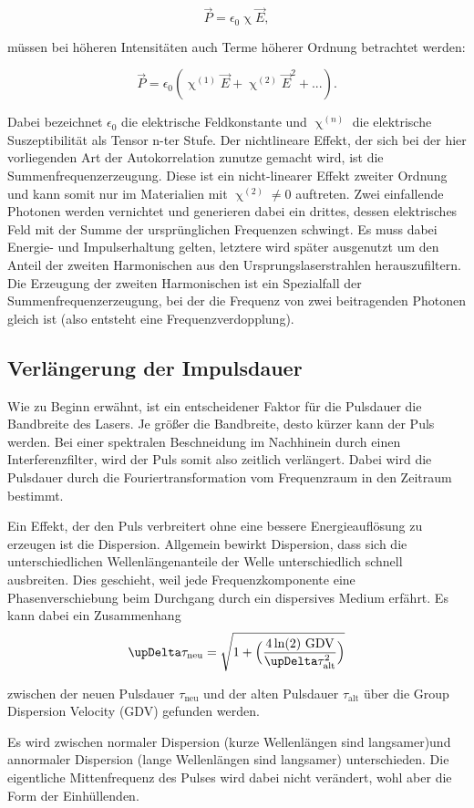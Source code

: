 \begin{equation}
    \vec P = \epsilon_0 \upchi \vec E,
\end{equation}

müssen bei höheren Intensitäten auch Terme höherer Ordnung betrachtet werden:

\begin{equation}
    \vec P = \epsilon_0 (\upchi ^{(1)}\vec E+\upchi ^{(2)}\vec E^2 +...).
\end{equation}

Dabei bezeichnet $\epsilon_0$ die elektrische Feldkonstante und $\upchi ^ {(n)}$ die elektrische Suszeptibilität als Tensor n-ter Stufe.
Der nichtlineare Effekt, der sich bei der hier vorliegenden Art der Autokorrelation zunutze gemacht wird,
ist die Summenfrequenzerzeugung. Diese ist ein nicht-linearer Effekt zweiter Ordnung und kann somit nur im Materialien mit $\upchi ^ {(2)}\neq 0$ auftreten.
Zwei einfallende Photonen werden vernichtet und generieren dabei ein drittes, dessen elektrisches Feld mit der 
Summe der ursprünglichen Frequenzen schwingt. 
Es muss dabei Energie- und Impulserhaltung gelten, letztere wird später ausgenutzt um den Anteil der zweiten Harmonischen aus den Ursprungslaserstrahlen herauszufiltern.
Die Erzeugung der zweiten Harmonischen ist ein Spezialfall der Summenfrequenzerzeugung, bei der die Frequenz von zwei beitragenden Photonen gleich ist (also entsteht eine Frequenzverdopplung).



\subsection{Verlängerung der Impulsdauer}
Wie zu Beginn erwähnt, ist ein entscheidener Faktor für die Pulsdauer die Bandbreite des Lasers.
Je größer die Bandbreite, desto kürzer kann der Puls werden.
Bei einer spektralen Beschneidung im Nachhinein durch einen Interferenzfilter, wird
der Puls somit also zeitlich verlängert. 
Dabei wird die Pulsdauer durch die Fouriertransformation vom Frequenzraum in den Zeitraum bestimmt.


Ein Effekt, der den Puls verbreitert ohne eine bessere Energieauflösung zu erzeugen ist die Dispersion.
Allgemein bewirkt Dispersion, dass sich die unterschiedlichen Wellenlängenanteile der Welle unterschiedlich schnell ausbreiten.
Dies geschieht, weil jede Frequenzkomponente eine Phasenverschiebung beim Durchgang
durch ein dispersives Medium erfährt.
Es kann dabei ein Zusammenhang 
\begin{equation}
    \upDelta \tau_{\text{neu}}= \sqrt{1+\Bigl(\frac{4 \,\text{ln(2) GDV}}{\upDelta \tau ^2_{\text{alt}}}\Bigr)}
    \label{eq:GVD}
\end{equation}

zwischen der neuen Pulsdauer $\tau_{\text{neu}}$ und der alten Pulsdauer $\tau_{\text{alt}}$ über die Group Dispersion Velocity (GDV)
gefunden werden.


Es wird zwischen normaler Dispersion (kurze Wellenlängen sind langsamer)und annormaler Dispersion (lange Wellenlängen sind langsamer) unterschieden.
Die eigentliche Mittenfrequenz des Pulses wird dabei nicht verändert, wohl aber die Form der Einhüllenden.

